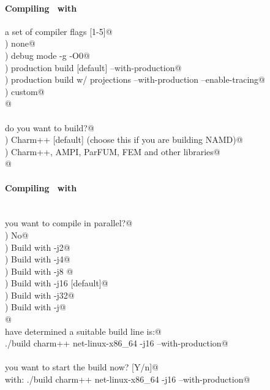 
\begin{frame}[fragile] 
\secframetitle{\ssInstallCharm}
\framesubtitle{Compiling \charm\ with }
\color{black}
\footnotesize

\verb@Choose a set of compiler flags [1-5]@ \\
) none@ \\
) debug mode                      -g -O0@ \\
) production build [default]      --with-production@ \\
) production build w/ projections --with-production --enable-tracing@ \\
) custom@ \\
\verb@  @
\pause
\ \\ \ \\
\verb@What do you want to build?@ \\
) Charm++ [default] (choose this if you are building NAMD)@ \\
) Charm++, AMPI, ParFUM, FEM and other libraries@ \\
\verb@  @
\end{frame}


\begin{frame}[fragile] 
\secframetitle{\ssInstallCharm}
\framesubtitle{Compiling \charm\ with }
\color{black}
\footnotesize
\ \\
\verb@Do you want to compile in parallel?@ \\
) No@ \\
) Build with -j2@ \\
) Build with -j4@ \\
) Build with -j8 @ \\
) Build with -j16 [default]@ \\
) Build with -j32@ \\
) Build with -j@ \\
\verb@  @
\ \\
\pause
\verb@We have determined a suitable build line is:@ \\
\verb@	./build charm++ net-linux-x86_64  -j16  --with-production@ \\
\ \\
\verb@Do you want to start the build now? [Y/n]@ \pause{}\\
\verb@Building with: ./build charm++ net-linux-x86_64  -j16 --with-production@

\end{frame}


